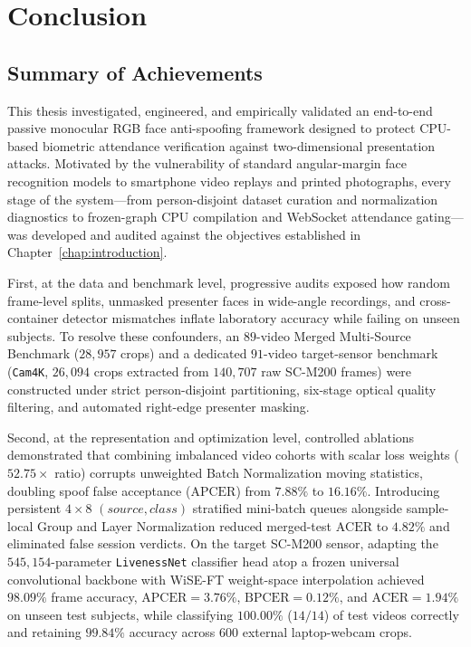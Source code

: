 \chapter{Conclusion}
\label{chap:conclusion}

\section{Summary of Achievements}
\label{sec:summary_achievements}

This thesis investigated, engineered, and empirically validated an end-to-end passive monocular RGB face anti-spoofing framework designed to protect CPU-based biometric attendance verification against two-dimensional presentation attacks. Motivated by the vulnerability of standard angular-margin face recognition models to smartphone video replays and printed photographs, every stage of the system---from person-disjoint dataset curation and normalization diagnostics to frozen-graph CPU compilation and WebSocket attendance gating---was developed and audited against the objectives established in Chapter~\ref{chap:introduction}.

First, at the data and benchmark level, progressive audits exposed how random frame-level splits, unmasked presenter faces in wide-angle recordings, and cross-container detector mismatches inflate laboratory accuracy while failing on unseen subjects. To resolve these confounders, an $89$-video Merged Multi-Source Benchmark ($28{,}957$ crops) and a dedicated $91$-video target-sensor benchmark (\texttt{Cam4K}, $26{,}094$ crops extracted from $140{,}707$ raw SC-M200 frames) were constructed under strict person-disjoint partitioning, six-stage optical quality filtering, and automated right-edge presenter masking.

Second, at the representation and optimization level, controlled ablations demonstrated that combining imbalanced video cohorts with scalar loss weights ($52.75\times$ ratio) corrupts unweighted Batch Normalization moving statistics, doubling spoof false acceptance ($\text{APCER}$) from $7.88\%$ to $16.16\%$. Introducing persistent $4\times8$ $(source, class)$ stratified mini-batch queues alongside sample-local Group and Layer Normalization reduced merged-test $\text{ACER}$ to $4.82\%$ and eliminated false session verdicts. On the target SC-M200 sensor, adapting the $545{,}154$-parameter \texttt{LivenessNet} classifier head atop a frozen universal convolutional backbone with WiSE-FT weight-space interpolation achieved $98.09\%$ frame accuracy, $\text{APCER} = 3.76\%$, $\text{BPCER} = 0.12\%$, and $\text{ACER} = 1.94\%$ on unseen test subjects, while classifying $100.00\%$ ($14/14$) of test videos correctly and retaining $99.84\%$ accuracy across $600$ external laptop-webcam crops.

